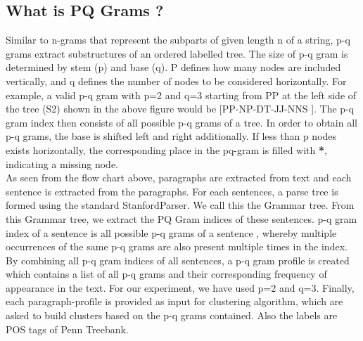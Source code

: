 \documentclass[letterpaper]{article}
\begin{document}
\subsection{What is PQ Grams ?}
Similar to n-grams that represent the subparts of given length n of a string, p-q grams extract substructures of an ordered labelled tree. The size of p-q gram is determined by stem (p) and base (q). P defines how many nodes are included vertically, and q defines the number of nodes to be considered horizontally. For example, a valid p-q gram with p=2 and q=3 starting from PP at the left side of the tree (S2) shown in the above figure would be [PP-NP-DT-JJ-NNS ]. The p-q gram index then consists of all possible p-q grams of a tree. In order to obtain all p-q grams, the base is shifted left and right additionally. If less than p nodes exists horizontally, the corresponding place in the pq-gram is filled with \textbf{*}, indicating a missing node.\\

As seen from the flow chart above, paragraphs are extracted from text and each sentence is extracted from the paragraphs. For each sentences, a parse tree is formed using the standard StanfordParser. We call this the Grammar tree. From this Grammar tree, we extract the PQ Gram indices of these sentences. p-q gram index of a sentence is all possible p-q grams of a sentence , whereby multiple occurrences of the same p-q grams are also present multiple times in the index. By combining all p-q gram indices of all sentences, a p-q gram profile is created which contains a list of all p-q grams and their corresponding frequency of appearance in the text.
For our experiment, we have used p=2 and q=3. Finally, each paragraph-profile is provided as input for clustering algorithm, which are asked to build clusters based on the p-q grams contained. Also the labels are POS tags of Penn Treebank.\\
\end{document}
